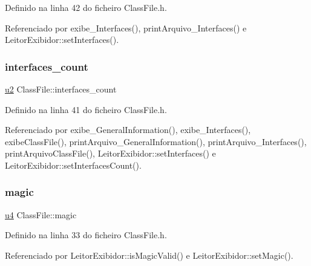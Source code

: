 Definido na linha 42 do ficheiro Class\+File.\+h.



Referenciado por exibe\+\_\+\+Interfaces(), print\+Arquivo\+\_\+\+Interfaces() e Leitor\+Exibidor\+::set\+Interfaces().

\mbox{\label{classClassFile_a337fcb7da33d1b64631441115c7de305}} 
\subsubsection{\texorpdfstring{interfaces\+\_\+count}{interfaces\_count}}
{\footnotesize\ttfamily \hyperlink{BasicTypes_8h_a732cde1300aafb73b0ea6c2558a7a54f}{u2} Class\+File\+::interfaces\+\_\+count}



Definido na linha 41 do ficheiro Class\+File.\+h.



Referenciado por exibe\+\_\+\+General\+Information(), exibe\+\_\+\+Interfaces(), exibe\+Class\+File(), print\+Arquivo\+\_\+\+General\+Information(), print\+Arquivo\+\_\+\+Interfaces(), print\+Arquivo\+Class\+File(), Leitor\+Exibidor\+::set\+Interfaces() e Leitor\+Exibidor\+::set\+Interfaces\+Count().

\mbox{\label{classClassFile_a09085e9db513dae2f46da6e0a26c1b59}} 
\subsubsection{\texorpdfstring{magic}{magic}}
{\footnotesize\ttfamily \hyperlink{BasicTypes_8h_ae5be1f726785414dd1b77d60df074c9d}{u4} Class\+File\+::magic}



Definido na linha 33 do ficheiro Class\+File.\+h.



Referenciado por Leitor\+Exibidor\+::is\+Magic\+Valid() e Leitor\+Exibidor\+::set\+Magic().

\mbox{\label{classClassFile_abede9cb937e65072517d0ee6e26e2757}} 
